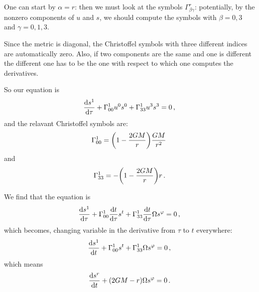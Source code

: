 \documentclass[main.tex]{subfiles}
\begin{document}
One can start by \(\alpha = r\): then we must look at the symbols \(\Gamma^{r}_{\beta \gamma }\): potentially, by the nonzero components of \(u\) and \(s\), we should compute the symbols with \(\beta = 0, 3 \) and \(\gamma = 0, 1, 3\). 

Since the metric is diagonal, the Christoffel symbols with three different indices are automatically zero.
Also, if two components are the same and one is different the different one has to be the one with respect to which one computes the derivatives. 

So our equation is 
%
\begin{align}
  \dv{s^{1}}{\tau } + \Gamma^{1}_{00} u^{0} s^{0} 
  + \Gamma^{1}_{33} u^{3} s^{3} = 0
\,,
\end{align}
%
and the relavant Christoffel symbols are: 
%
\begin{align}
  \Gamma^{1}_{00} = \qty(1 - \frac{2GM}{r}) \frac{GM}{r^2}
\,
\end{align}
%
and 
%
\begin{align}
  \Gamma^{1}_{33} = - \qty(1 - \frac{2GM}{r})r
\,.
\end{align}

We find that the equation is 
%
\begin{align}
  \dv{s^{1}}{\tau } + \Gamma^{1}_{00} \dv{t}{\tau } s^{t}
  + \Gamma^{1}_{33} \dv{t}{\tau } \Omega s^{\varphi } = 0
\,,
\end{align}
%
which becomes, changing variable in the derivative from \(\tau \) to \(t\) everywhere: 
%
\begin{align}
\dv{s^{1}}{t} + \Gamma^{1}_{00}  s^{t}
+ \Gamma^{1}_{33}  \Omega s^{\varphi } = 0
  \,,
\end{align}
%
which means 
%
\begin{align}
  \dv{s^{r}}{t} + \qty(2GM - r)\Omega s^{\varphi }= 0
\,.
\end{align}
\end{document}
